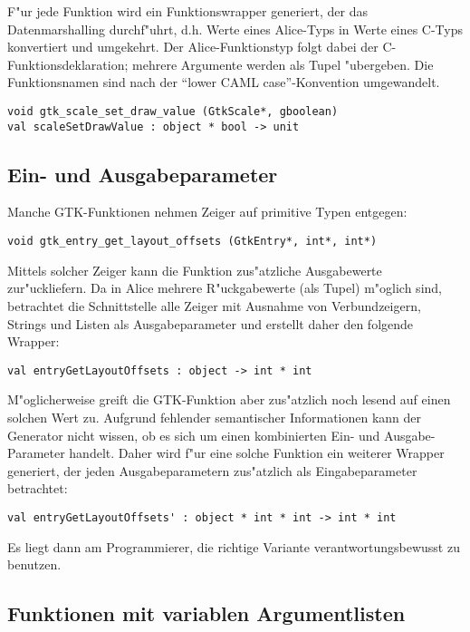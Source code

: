 \documentclass{article}
\begin{document}
F"ur jede Funktion wird ein Funktionswrapper generiert, der das
Datenmarshalling durchf"uhrt, d.h. Werte eines Alice-Typs in Werte eines
C-Typs konvertiert und umgekehrt. Der Alice-Funktionstyp folgt dabei der
C-Funktionsdeklaration; mehrere Argumente werden als Tupel "ubergeben.
Die Funktionsnamen sind nach der ``lower CAML case''-Konvention
umgewandelt.

\begin{verbatim}
void gtk_scale_set_draw_value (GtkScale*, gboolean)
val scaleSetDrawValue : object * bool -> unit
\end{verbatim}

\subsection*{Ein- und Ausgabeparameter}

Manche GTK-Funktionen nehmen Zeiger auf primitive Typen entgegen:

\begin{verbatim}
void gtk_entry_get_layout_offsets (GtkEntry*, int*, int*)
\end{verbatim}

Mittels solcher Zeiger kann die Funktion zus"atzliche Ausgabewerte
zur"uckliefern. Da in Alice mehrere R"uckgabewerte (als Tupel) m"oglich sind,
betrachtet die Schnittstelle alle Zeiger mit Ausnahme von Verbundzeigern,
Strings und Listen als Ausgabeparameter und erstellt daher den folgende
Wrapper:

\begin{verbatim}
val entryGetLayoutOffsets : object -> int * int
\end{verbatim}

M"oglicherweise greift die GTK-Funktion aber zus"atzlich noch lesend auf 
einen solchen Wert zu. Aufgrund fehlender semantischer Informationen kann
der Generator nicht wissen, ob es sich um einen kombinierten Ein- und
Ausgabe-Parameter handelt.
Daher wird f"ur eine solche Funktion ein weiterer Wrapper generiert,
der jeden Ausgabeparametern zus"atzlich als Eingabeparameter betrachtet:

\begin{verbatim}
val entryGetLayoutOffsets' : object * int * int -> int * int
\end{verbatim}

Es liegt dann am Programmierer, die richtige Variante verantwortungsbewusst
zu benutzen.

\subsection*{Funktionen mit variablen Argumentlisten}
\end{document}
